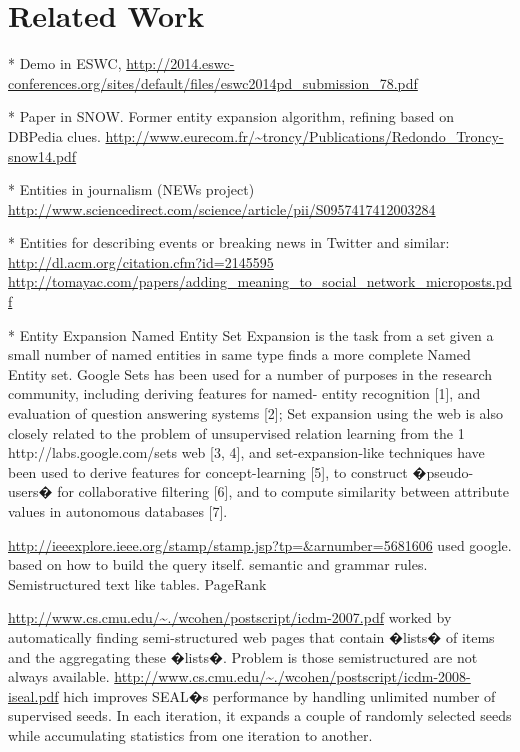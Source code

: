 \documentclass{llncs}
\begin{document}
\section{Related Work}
\label{sec:RelatedWork}

* Demo in ESWC,
\url{http://2014.eswc-conferences.org/sites/default/files/eswc2014pd_submission_78.pdf}

* Paper in SNOW. Former entity expansion algorithm, refining based on DBPedia clues.
\url{http://www.eurecom.fr/~troncy/Publications/Redondo_Troncy-snow14.pdf}

* Entities in journalism (NEWs project)
\url{http://www.sciencedirect.com/science/article/pii/S0957417412003284}

* Entities for describing events or breaking news in Twitter and similar:
\url{http://dl.acm.org/citation.cfm?id=2145595}
\url{http://tomayac.com/papers/adding_meaning_to_social_network_microposts.pdf}

* Entity Expansion
Named Entity Set Expansion is the task from a set given a small number of named entities in same type finds a more complete Named Entity set.
Google Sets has been used for a number of purposes in the research community, including deriving features for named- entity recognition [1], and evaluation of question answering systems [2]; 
Set expansion using the web is also closely related to the problem of unsupervised relation learning from the
1 http://labs.google.com/sets
web [3, 4], and set-expansion-like techniques have been used to derive features for concept-learning [5], to construct �pseudo-users� for collaborative filtering [6], and to compute similarity between attribute values in autonomous databases [7].


\url{http://ieeexplore.ieee.org/stamp/stamp.jsp?tp=&arnumber=5681606}
used google.
based on how to build the query itself. semantic and grammar rules. Semistructured text like tables. PageRank

\url{http://www.cs.cmu.edu/~./wcohen/postscript/icdm-2007.pdf}
 worked by automatically finding semi-structured web pages that contain �lists� of items and the aggregating these �lists�. Problem is those semistructured are not always available.
\url{http://www.cs.cmu.edu/~./wcohen/postscript/icdm-2008-iseal.pdf}
hich improves SEAL�s performance by handling unlimited number of supervised seeds. In each iteration, it expands a couple of randomly selected seeds while accumulating statistics from one iteration to another.
\end{document}
